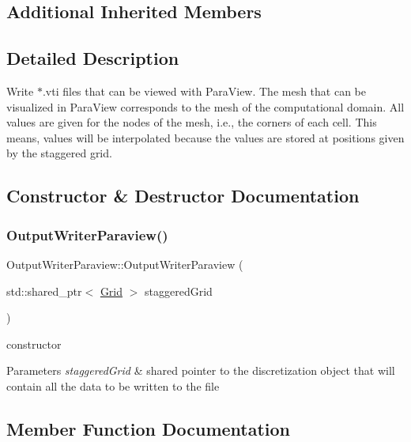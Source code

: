 \subsection*{Additional Inherited Members}


\subsection{Detailed Description}
Write $\ast$.vti files that can be viewed with Para\+View. The mesh that can be visualized in Para\+View corresponds to the mesh of the computational domain. All values are given for the nodes of the mesh, i.\+e., the corners of each cell. This means, values will be interpolated because the values are stored at positions given by the staggered grid. 

\subsection{Constructor \& Destructor Documentation}
\mbox{\label{classOutputWriterParaview_ad746db20555053729cc199ec4433a0ca}} 
\subsubsection{\texorpdfstring{OutputWriterParaview()}{OutputWriterParaview()}}
{\footnotesize\ttfamily Output\+Writer\+Paraview\+::\+Output\+Writer\+Paraview (\begin{DoxyParamCaption}\item[{std\+::shared\+\_\+ptr$<$ \mbox{\hyperlink{classGrid}{Grid}} $>$}]{staggered\+Grid }\end{DoxyParamCaption})}

constructor 
\begin{DoxyParams}{Parameters}
{\em staggered\+Grid} & shared pointer to the discretization object that will contain all the data to be written to the file \\
\hline
\end{DoxyParams}


\subsection{Member Function Documentation}
\mbox{\label{classOutputWriterParaview_a9e203b63d0e2f26ad53d18ee1821c6bb}} 
